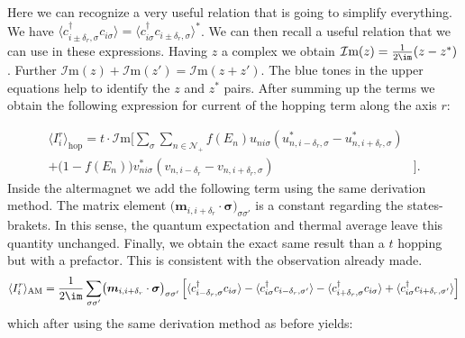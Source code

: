 \documentclass[../main.tex]{subfile}
\begin{document}
Here we can recognize a very useful relation that is going to simplify everything. We have $\langle c_{i\pm\delta_r,\sigma}^{\dagger} c_{i\sigma}\rangle = \langle c_{i\sigma}^{\dagger}c_{i\pm\delta_{r},\sigma} \rangle^{\ast}$.
We can then recall a useful relation that we can use in these expressions. 
Having $z$ a complex we obtain $\mathcal{I}\text{m}(z) = \frac{1}{2\im}(z-z^{\ast})$. Further $\mathcal{I}\text{m}(z)+\mathcal{I}\text{m}(z') = \mathcal{I}\text{m}(z+z')$.
The blue tones in the upper equations help to identify the $z$ and $z^{\ast}$ pairs.
After summing up the terms we obtain the following expression for current of the hopping term along the axis $r$:

\begin{equation}
    \begin{aligned}
        \langle I_i^r\rangle_{\text{hop}} = t\cdot\mathcal{I}\text{m}\biggl[ \sum_{\sigma}\sum_{n\in\mathcal{N}_+} 
            f(E_n)u_{ni\sigma}\left(u_{n,i-\delta_r,\sigma}^{\ast} - u_{n,i+\delta_r,\sigma}^{\ast}\right) &\\
            +\bigl(1-f(E_n)\bigr) v_{ni\sigma}^{\ast}\left(v_{n,i-\delta_r} - v_{n,i+\delta_r,\sigma}\right)&\biggr].
    \end{aligned}
\end{equation}
Inside the altermagnet we add the following term using the same derivation method. The matrix element $\bigl(\bm{m}_{i,i+\delta_r}\cdot\bm{\sigma}\bigr)_{\sigma\sigma'}$ is a constant regarding
the states-brakets. In this sense, the quantum expectation and thermal average leave this quantity unchanged. Finally, we obtain the exact
same result than a $t$ hopping but with a prefactor. This is consistent with the observation already made.
\begin{equation*}
    \begin{aligned}
    \langle I_i^r\rangle_{\text{AM}} = \frac{1}{2\im}\sum_{\sigma\sigma'}\bigl(\bm{m}_{i,i+\delta_r}\cdot\bm{\sigma}\bigr)_{\sigma\sigma'}\left[
        \langle c_{i-\delta_{r},\sigma}^{\dagger} c_{i\sigma}\rangle
        -\langle c_{i\sigma}^{\dagger}            c_{i-\delta_{r},\sigma'}\rangle
        -\langle c_{i+\delta_{r},\sigma}^{\dagger} c_{i\sigma}\rangle
        +\langle c_{i\sigma}^{\dagger}            c_{i+\delta_{r},\sigma'}\rangle\right]
\end{aligned}
\end{equation*}
which after using the same derivation method as before yields:
\end{document}
